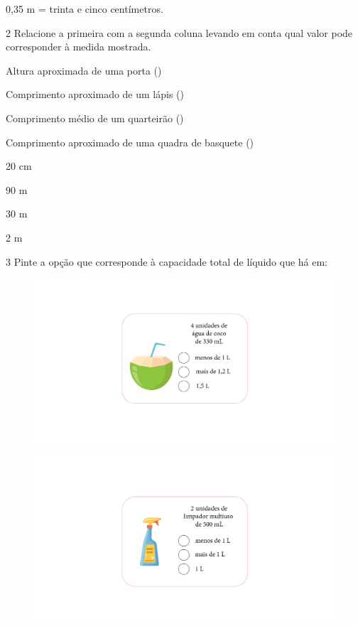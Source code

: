 {{0,35 m = trinta e cinco centímetros.}

\num{2} Relacione a primeira com a segunda coluna levando em conta qual
valor pode corresponder à medida mostrada.

\begin{multicols}{2}

Altura aproximada de uma porta ()

Comprimento aproximado de um lápis (\coment{20 cm})

Comprimento médio de um quarteirão ()

Comprimento aproximado de uma quadra de basquete ()

\columnbreak

20 cm
 
90 m

30 m
 
2 m
\end{multicols}


\num{3} Pinte a opção que corresponde à capacidade total de líquido que
há em:

\begin{figure}[htpb!]
\includegraphics[width=.5\textwidth]{../ilustracoes/MAT5/SAEB_5ANO_MAT_figura31.png}
\includegraphics[width=.5\textwidth]{../ilustracoes/MAT5/SAEB_5ANO_MAT_figura31a.png}
\end{figure}

}
